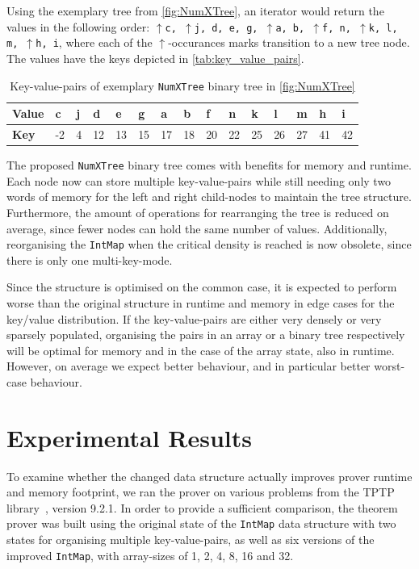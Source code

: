 \documentclass[]{ceurart}
\begin{document}
Using the exemplary tree from \autoref{fig:NumXTree}, an iterator
would return the values in the following order: \texttt{$\uparrow$c,
  $\uparrow$j, d, e, g, $\uparrow$a, b, $\uparrow$f, n, $\uparrow$k,
  l, m, $\uparrow$h, i}, where each of the $\uparrow$-occurances marks
transition to a new tree node. The values have the keys depicted
in \autoref{tab:key_value_pairs}.


\begin{table}[h!]
  \centering
    \begin{tabular}{|l|l|l|l|l|l|l|l|l|l|l|l|l|l|l|}
      \hline
      \textbf{Value} & c & j & d & e & g & a & b & f & n & k & l & m & h & i \\ \hline
      \textbf{Key} & -2 & 4 & 12 & 13 & 15 & 17 & 18 & 20 & 22 & 25 & 26 & 27 & 41 & 42  \\ \hline
    \end{tabular}
  \caption{
    Key-value-pairs of exemplary \texttt{NumXTree} binary tree
    in \autoref{fig:NumXTree}
    }
  \label{tab:key_value_pairs}
\end{table}

The proposed \texttt{NumXTree} binary tree comes with benefits for
memory and runtime. Each node now can store multiple key-value-pairs
while still needing only two words of memory for the left and right
child-nodes to maintain the tree structure.  Furthermore, the amount
of operations for rearranging the tree is reduced on average, since
fewer nodes can hold the same number of values. Additionally,
reorganising the \texttt{IntMap} when the critical density is reached
is now obsolete, since there is only one multi-key-mode.

Since the structure is optimised on the common case, it is expected to
perform worse than the original structure in runtime and memory in
edge cases for the key/value distribution. If the key-value-pairs are
either very densely or very sparsely populated, organising the pairs
in an array or a binary tree respectively will be optimal for memory
and in the case of the array state, also in runtime. However, on
average we expect better behaviour, and in particular better
worst-case behaviour.

\section{Experimental Results}

To examine whether the changed data structure actually improves prover
runtime and memory footprint, we ran the prover on various problems
from the TPTP library~\cite{Sutcliffe:JAR-2017}, version 9.2.1. In
order to provide a sufficient comparison, the theorem prover was built
using the original state of the \texttt{IntMap} data structure with
two states for organising multiple key-value-pairs, as well as six
versions of the improved \texttt{IntMap}, with array-sizes of 1, 2, 4,
8, 16 and 32.
\end{document}
